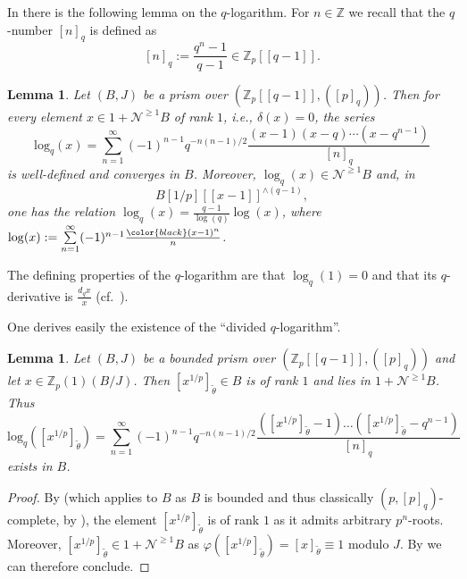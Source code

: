 \documentclass{amsart}
\theoremstyle{plain}
\newtheorem{lemma}[theorem]{Lemma}
\theoremstyle{definition}
\newcommand{\Z}{\mathbb{Z}}
\newcommand{\red}[1]{{\color{black} #1}}
\newcommand{\blue}[1]{{\color{black}#1}}
\begin{document}
In \cite[Lemma 4.10]{anschuetz_le_bras_the_cyclotomic_trace_in_degree_2} there is the following lemma on the $q$-logarithm.
For $n\in \Z$ we recall that the $q$-number $[n]_q$ is defined as
$$
[n]_q:=\frac{q^n-1}{q-1}\in \Z_p[[q-1]].
$$

\begin{lemma}
  \label{sec:q-logarithm-convergence-of-q-logarithm}
  Let $(B,J)$ be a prism over $(\Z_p[[q-1]],([p]_q))$. Then for every
  element $x\in 1+\mathcal{N}^{\geq 1} B$ of rank $1$, i.e., $\delta(x)=0$, the series
$$
\mathrm{log}_q(x)=\sum\limits_{n=1}^\infty
(-1)^{n-1}q^{-n(n-1)/2}\frac{(x-1)(x-q)\cdots (x-q^{n-1})}{[n]_q}
$$
is well-defined and converges in $B$. Moreover,
$\log_q(x)\in \mathcal{N}^{\geq 1}B$ and, \red{in $$B[1/p][[x-1]]^{\wedge (q-1)},$$ one has the relation $\log_q(x)=\frac{q-1}{\log(q)}\log(x)$, where $\mathrm{log}(x):=\sum\limits_{n=1}^\infty (-1)^{n-1}\frac{\blue{(x-1)^n}}{n}$}.
\end{lemma}

The defining properties of the $q$-logarithm are that $\log_q(1)=0$ and that its $q$-derivative is $\frac{d_qx}{x}$ (cf.\ \cite[Lemma 4.6]{anschuetz_le_bras_the_cyclotomic_trace_in_degree_2}).

One derives easily the existence of the ``divided $q$-logarithm''.

\begin{lemma}
\label{sec:prism-dieud-module-lemma-divided-logarithm}
  Let $(B,J)$ be a \red{bounded} prism over $(\Z_p[[q-1]],([p]_q))$ and let $x\in \Z_p(1)(B/J)$. Then $[x^{1/p}]_{\tilde{\theta}}\in B$ is of rank $1$ and lies in $1+\mathcal{N}^{\geq 1}B$. Thus
  $$
  \mathrm{log}_q([x^{1/p}]_{\tilde{\theta}})=\sum\limits_{n=1}^\infty (-1)^{n-1}q^{-n(n-1)/2}\frac{([x^{1/p}]_{\tilde{\theta}}-1)\ldots ([x^{1/p}]_{\tilde{\theta}}-q^{n-1})}{[n]_q}
  $$
  exists in $B$.
\end{lemma}
\begin{proof}
  By  \red{(which applies to $B$ as $B$ is bounded and thus classically $(p,[p]_q)$-complete, by \cite[Lemma 3.7 (1)]{bhatt_scholze_prisms_and_prismatic_cohomology})}, the element $[x^{1/p}]_{\tilde{\theta}}$ is of rank $1$ as it admits arbitrary $p^n$-roots. Moreover, $[x^{1/p}]_{\tilde{\theta}}\in 1+\mathcal{N}^{\geq 1}B$ as $\varphi([x^{1/p}]_{\tilde{\theta}})=[x]_{\tilde{\theta}}\equiv 1$ modulo $J$. 
  By  we can therefore conclude.
\end{proof}
\end{document}
